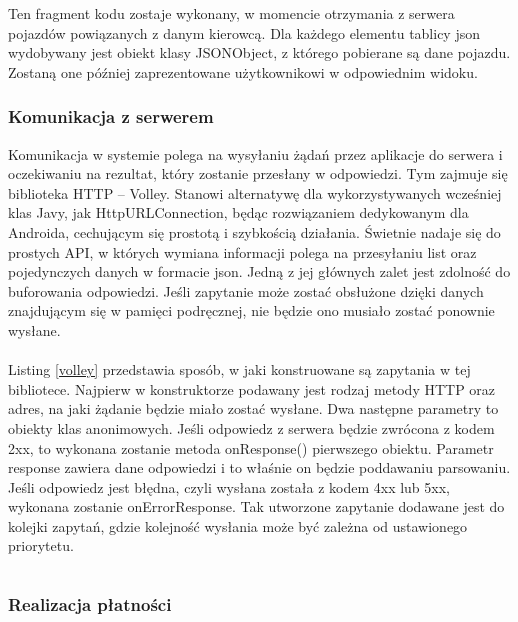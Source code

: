 Ten fragment kodu zostaje wykonany, w momencie otrzymania z serwera pojazdów powiązanych z danym kierowcą. Dla każdego elementu tablicy json wydobywany jest obiekt klasy JSONObject, z którego pobierane są dane pojazdu. Zostaną one później zaprezentowane użytkownikowi w odpowiednim widoku.

\subsubsection*{Komunikacja z serwerem}

Komunikacja w systemie polega na wysyłaniu żądań przez aplikacje do serwera i oczekiwaniu na rezultat, który zostanie przesłany w odpowiedzi. Tym zajmuje się biblioteka HTTP -- Volley. Stanowi alternatywę dla wykorzystywanych wcześniej klas Javy, jak HttpURLConnection, będąc rozwiązaniem dedykowanym dla Androida, cechującym się prostotą i szybkością działania. Świetnie nadaje się do prostych API, w których wymiana informacji polega na przesyłaniu list oraz pojedynczych danych w formacie json. Jedną z jej głównych zalet jest zdolność do buforowania odpowiedzi. Jeśli zapytanie może zostać obsłużone dzięki danych znajdującym się w pamięci podręcznej, nie będzie ono musiało zostać ponownie wysłane.
\\
\\
Listing \ref{volley} przedstawia sposób, w jaki konstruowane są zapytania w tej bibliotece. Najpierw w konstruktorze podawany jest rodzaj metody HTTP oraz adres, na jaki żądanie będzie miało zostać wysłane. Dwa następne parametry to obiekty klas anonimowych. Jeśli odpowiedz z serwera będzie zwrócona z kodem 2xx, to wykonana zostanie metoda onResponse() pierwszego obiektu. Parametr response zawiera dane odpowiedzi i to właśnie on będzie poddawaniu parsowaniu. Jeśli odpowiedz jest błędna, czyli wysłana została z kodem 4xx lub 5xx, wykonana zostanie onErrorResponse. Tak utworzone zapytanie dodawane jest do kolejki zapytań, gdzie kolejność wysłania może być zależna od ustawionego priorytetu.

\begin{singlespace}
	\label{volley}
	\vspace{0.3cm}
	\inputminted[fontsize=\footnotesize, linenos=true]{java}{src/imp/scan-activity.java}
\end{singlespace}

\subsubsection*{Realizacja płatności}

